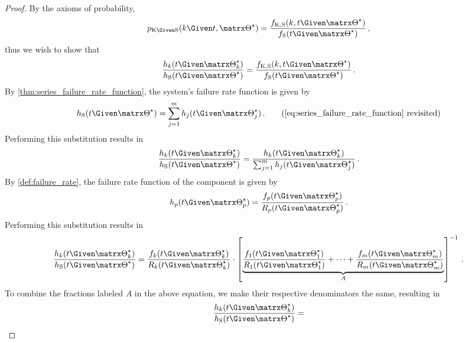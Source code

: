 \documentclass[../main.tex]{subfiles}
\begin{document}
\begin{proof}
By the axioms of probability,
\begin{equation}
    \pmf_{\RV{K} \Given \sv}(k \Given t, \tparam\sysparam) =
    \frac { \pdf_{\RV{K}, \sv}(k, t \Given \tparam{\sysparam}) }
    { \spdf(t \Given \tparam{\sysparam}) }\,,
\end{equation}
thus we wish to show that
\begin{equation}
\label{eq:proof_cor_K_given_S_failure_rate}
    \frac{\haz_k(t \Given \tparam{\sysparam}_k)}{\haz_{\sv}(t \Given \tparam{\sysparam})} =
    \frac   { \pdf_{\RV{K}, \sv}(k, t \Given \tparam{\sysparam}) }
            { \spdf(t \Given \tparam{\sysparam}) }\,.
\end{equation}
By \cref{thm:series_failure_rate_function}, the system's failure rate function is given by
\begin{equation*}
\haz_{\sv}(t \Given \tparam\sysparam) = \sum_{j=1}^{m} \haz_j(t \Given \tparam{\sysparam}_j)\,.
\tag{\ref{eq:series_failure_rate_function} revisited}
\end{equation*}
Performing this substitution results in
\begin{equation}
    \frac{\haz_k(t \Given \tparam{\sysparam}_k)}{\haz_{\sv}(t \Given \tparam{\sysparam})} = \frac{\haz_k(t \Given \tparam{\sysparam}_k)}{\sum_{j=1}^{m} \haz_j(t \Given \tparam{\sysparam}_j) }\,.
\end{equation}
By \cref{def:failure_rate}, the failure rate function of the \pth component is given by
\begin{equation}
    \haz_p(t \Given \tparam{\sysparam}_p) = \frac{\pdf_p(t \Given \tparam{\sysparam}_p)}{\srv_p(t \Given \tparam{\sysparam}_p)}\,.
\end{equation}
Performing this substitution results in
\begin{equation}
    \frac{\haz_k(t \Given \tparam{\sysparam}_k)}{\haz_{\sv}(t \Given \tparam{\sysparam})} = \frac{\pdf_k(t \Given \tparam{\sysparam}_k)}{\srv_k(t \Given \tparam{\sysparam}_k)} \cdot
    \left [
        \underbrace{
            \frac{\pdf_1(t \Given \tparam{\sysparam}_1)}{\srv_1(t \Given \tparam{\sysparam}_1)} + \cdots + \frac{\pdf_m(t \Given \tparam{\sysparam}_m)}{\srv_m(t \Given \tparam{\sysparam}_m)}
        }_{A}
    \right ]^{-1}\,.
\end{equation}
To combine the fractions labeled $A$ in the above equation, we make their respective denominators the same, resulting in
\begin{equation}
    \frac{\haz_k(t \Given \tparam{\sysparam}_k)}{\haz_{\sv}(t \Given \tparam\sysparam)} =

\end{equation}
\end{proof}
\end{document}
